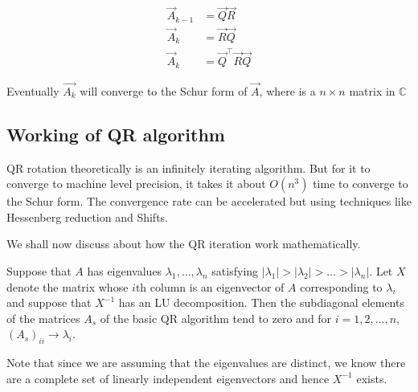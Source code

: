 \documentclass[journal]{IEEEtran}
\numberwithin{equation}{section}
\begin{document}
\begin{align}
    \vec{A}_{k-1} &= \vec{Q}\vec{R}\\
    \vec{A}_k &= \vec{R}\vec{Q}\\
    \vec{A}_k &= \vec{Q}^\top\vec{R}\vec{Q}
\end{align}


Eventually $\vec{A_k}$ will converge to the Schur form of $\vec{A}$, where is a $n \times n$ matrix in $\mathbb{C}$ 

\subsection{Working of QR algorithm}

QR rotation theoretically is an infinitely iterating algorithm. But for it to converge to machine level precision, it takes it about $O(n^3)$ time to converge to the Schur form. The convergence rate can be accelerated but using techniques like Hessenberg reduction and Shifts.

We shall now discuss about how the QR iteration work mathematically. 



\begin{theorem}
Suppose that \(A\) has eigenvalues \(\lambda_1, \dots, \lambda_n\) satisfying \(|\lambda_1| > |\lambda_2| > \dots > |\lambda_n|\). Let \(X\) denote the matrix whose \(i\)th column is an eigenvector of \(A\) corresponding to \(\lambda_i\) and suppose that \(X^{-1}\) has an LU decomposition. Then the subdiagonal elements of the matrices \(A_s\) of the basic QR algorithm tend to zero and for \(i = 1, 2, \dots, n\), \((A_s)_{ii} \to \lambda_i\).
\end{theorem}
Note that since we are assuming that the eigenvalues are distinct, we know there are a complete set of linearly independent eigenvectors and hence \(X^{-1}\) exists.
\end{document}
